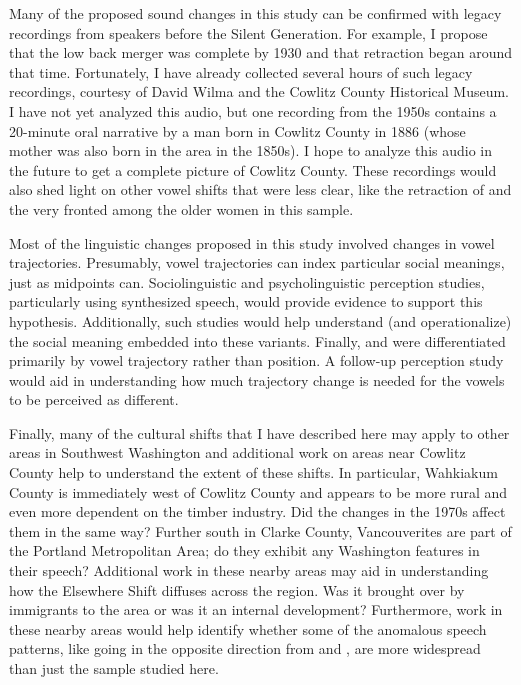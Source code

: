 Many of the proposed sound changes in this study can be confirmed with legacy recordings from speakers before the Silent Generation. For example, I propose that the low back merger was complete by 1930 and that \trap retraction began around that time. Fortunately, I have already collected several hours of such legacy recordings, courtesy of David Wilma and the Cowlitz County Historical Museum. I have not yet analyzed this audio, but one recording from the 1950s contains a 20-minute oral narrative by a man born in Cowlitz County in 1886 (whose mother was also born in the area in the 1850s). I hope to analyze this audio in the future to get a complete picture of Cowlitz County. These recordings would also shed light on other vowel shifts that were less clear, like the retraction of \bin and the very fronted \ben among the older women in this sample.

Most of the linguistic changes proposed in this study involved changes in vowel trajectories. Presumably, vowel trajectories can index particular social meanings, just as midpoints can. Sociolinguistic and psycholinguistic perception studies, particularly using synthesized speech, would provide evidence to support this hypothesis. Additionally, such studies would help understand (and operationalize) the social meaning embedded into these variants. Finally, \lot and \thought were differentiated primarily by vowel trajectory rather than position. A follow-up perception study would aid in understanding how much trajectory change is needed for the vowels to be perceived as different.

Finally, many of the cultural shifts that I have described here may apply to other areas in Southwest Washington and additional work on areas near Cowlitz County help to understand the extent of these shifts. In particular, Wahkiakum County is immediately west of Cowlitz County and appears to be more rural and even more dependent on the timber industry. Did the changes in the 1970s affect them in the same way? Further south in Clarke County, Vancouverites are part of the Portland Metropolitan Area; do they exhibit any Washington features in their speech? Additional work in these nearby areas may aid in understanding how the Elsewhere Shift diffuses across the region. Was it brought over by immigrants to the area or was it an internal development? Furthermore, work in these nearby areas would help identify whether some of the anomalous speech patterns, like \ben going in the opposite direction from \ban and \bin, are more widespread than just the sample studied here.





